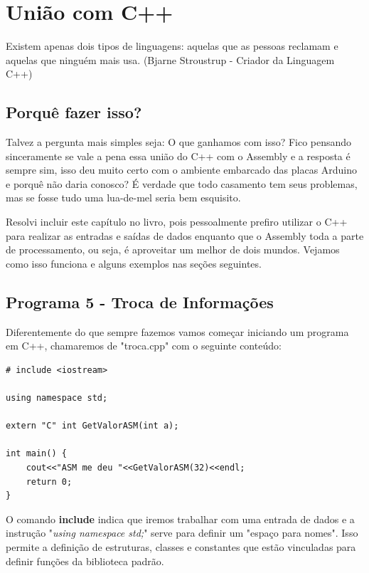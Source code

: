 \chapter{União com C++}

\begin{remark}
	Existem apenas dois tipos de linguagens: aquelas que as pessoas reclamam e aquelas que ninguém mais usa. (Bjarne Stroustrup - Criador da Linguagem C++) 
\end{remark}

\section{Porquê fazer isso?}
Talvez a pergunta mais simples seja: O que ganhamos com isso? Fico pensando sinceramente se vale a pena essa união do C++ com o Assembly e a resposta é sempre sim, isso deu muito certo com o ambiente embarcado das placas Arduino e porquê não daria conosco? É verdade que todo casamento tem seus problemas, mas se fosse tudo uma lua-de-mel seria bem esquisito.

Resolvi incluir este capítulo no livro, pois pessoalmente prefiro utilizar o C++ para realizar as entradas e saídas de dados enquanto que o Assembly toda a parte de processamento, ou seja, é aproveitar um melhor de dois mundos. Vejamos como isso funciona e alguns exemplos nas seções seguintes.

\section{Programa 5 - Troca de Informações}

Diferentemente do que sempre fazemos vamos começar iniciando um programa em C++, chamaremos de "troca.cpp" com o seguinte conteúdo:
\begin{lstlisting}[]
# include <iostream>

using namespace std;

extern "C" int GetValorASM(int a);

int main() {
	cout<<"ASM me deu "<<GetValorASM(32)<<endl;
	return 0;
}
\end{lstlisting}

O comando \textbf{include} indica que iremos trabalhar com uma entrada de dados e a instrução "\textit{using namespace std;}" serve para definir um "espaço para nomes". Isso permite a definição de estruturas, classes e constantes que estão vinculadas para definir funções da biblioteca padrão. 

